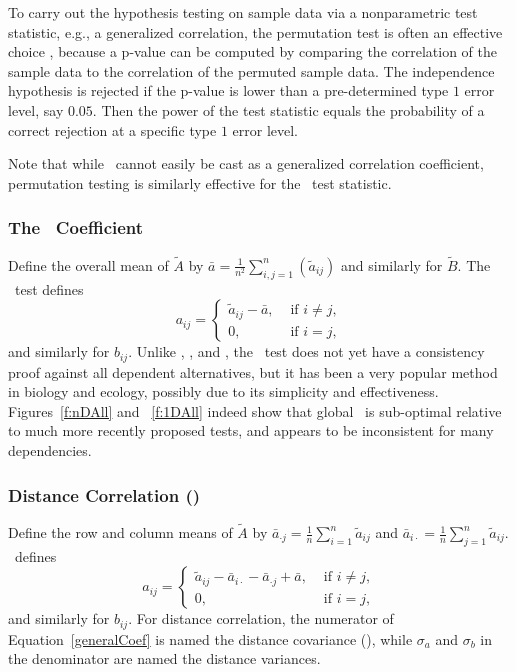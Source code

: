 \documentclass[11pt]{extarticle}
\begin{document}
To carry out the hypothesis testing on sample data via a nonparametric test statistic, e.g., a generalized correlation, the permutation test is often an effective choice \cite{GoodPermutationBook}, because a p-value can be computed by comparing the correlation of the sample data to the correlation of the permuted sample data. The independence hypothesis is rejected if the p-value is lower than a pre-determined type $1$ error level, say $0.05$. Then the power of the test statistic equals the probability of a correct rejection at a specific type $1$ error level.

Note that while \Hhg~cannot easily be cast as a generalized correlation coefficient, permutation testing is similarly effective for the \Hhg~test statistic.

\subsubsection{The \Mantel~Coefficient}
\label{appen:mantel}

Define the overall mean of $\tilde{A}$ by $\bar{a}=\tfrac{1}{n^2}\sum_{i,j=1}^{n}(\tilde{a}_{ij})$ and similarly for $\tilde{B}$.
The \Mantel~test defines
\[a_{ij} = \left\{
  \begin{array}{lr}
    \tilde{a}_{ij}-\bar{a}, & \mbox{ if } i \neq j, \\
    0, &\mbox{ if } i = j,
  \end{array}
\right.
\]
and similarly for $b_{ij}$.
Unlike \Dcorr, \Mcorr, and \Hhg, the \Mantel~test does not yet have a consistency proof against all dependent alternatives,
but it has been a very popular method in biology and ecology, possibly due to its simplicity and effectiveness. Figures~\ref{f:nDAll} and ~\ref{f:1DAll} indeed show that global \Mantel~is sub-optimal relative to much more recently proposed tests, and appears to be inconsistent for many dependencies.

\subsubsection{Distance Correlation (\Dcorr)}
\label{appen:dcorr}

Define the row and column means of $\tilde{A}$ by $\bar{a}_{\cdot j}=\frac{1}{n} \sum_{i=1}^n \tilde{a}_{ij}$ and $\bar{a}_{i \cdot}=\frac{1}{n} \sum_{j=1}^n \tilde{a}_{ij} $.
\Dcorr~defines
\[a_{ij} = \left\{
  \begin{array}{lr}
    \tilde{a}_{ij}-\bar{a}_{i\cdot} - \bar{a}_{\cdot j} + \bar{a}, & \mbox{ if } i \neq j, \\
    0, &\mbox{ if } i = j,
  \end{array}
\right.
\]
and similarly for $b_{ij}$.
For distance correlation, the numerator of Equation~\ref{generalCoef} is named the distance covariance (\Dcov), while $\sigma_a$ and $\sigma_b$ in the denominator are named the distance variances.
\end{document}
